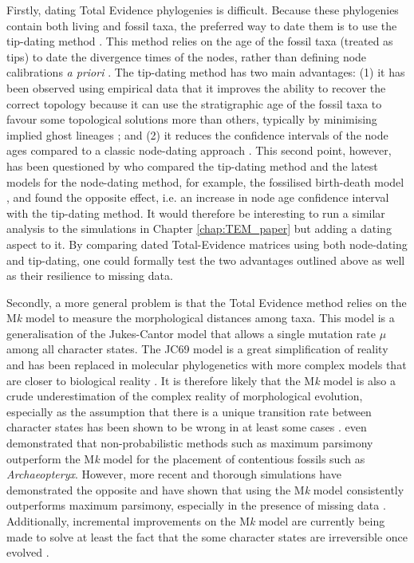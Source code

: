 Firstly, dating Total Evidence phylogenies is difficult. 
Because these phylogenies contain both living and fossil taxa, the preferred way to date them is to use the tip-dating method \citep[e.g.][]{ronquista2012,Wood01032013,Dembo2015}.
This method relies on the age of the fossil taxa (treated as tips) to date the divergence times of the nodes, rather than defining node calibrations \textit{a priori} \citep[cf. node-dating;][]{ronquista2012}.
The tip-dating method has two main advantages: (1) it has been observed using empirical data that it improves the ability to recover the correct topology because it can use the stratigraphic age of the fossil taxa to favour some topological solutions more than others, typically by minimising implied ghost lineages \citep[][and personal communications]{BEASTmaster}; and (2) it reduces the confidence intervals of the node ages compared to a classic node-dating approach \citep{ronquista2012}.
This second point, however, has been questioned by \cite{Arcila2015131} who compared the tip-dating method and the latest models for the node-dating method, for example, the fossilised birth-death model \citep{heaththe2013}, and found the opposite effect, i.e. an increase in node age confidence interval with the tip-dating method.
It would therefore be interesting to run a similar analysis to the simulations in Chapter \ref{chap:TEM_paper} but adding a dating aspect to it.
By comparing dated Total-Evidence matrices using both node-dating and tip-dating, one could formally test the two advantages outlined above as well as their resilience to missing data.

Secondly, a more general problem is that the Total Evidence method relies on the M\textit{k} model \citep{lewisa2001} to measure the morphological distances among taxa.
This model is a generalisation of the Jukes-Cantor model \citep[JC69;][]{jukes1969evolution} that allows a single mutation rate $\mu$ among all character states.
The JC69 model is a great simplification of reality and has been replaced in molecular phylogenetics with more complex models that are closer to biological reality \citep[e.g. the GTR model that allows a different rate for each different type of nucleotide change;][]{tavare1986}.
It is therefore likely that the M\textit{k} model is also a crude underestimation of the complex reality of morphological evolution, especially as the assumption that there is a unique transition rate between character states has been shown to be wrong in at least some cases \citep[e.g. for Dollo traits that are irreversible;][]{WrightDollo}.
\cite{spencerefficacy2013} even demonstrated that non-probabilistic methods such as maximum parsimony outperform the M\textit{k} model for the placement of contentious fossils such as \textit{Archaeopteryx}.
However, more recent and thorough simulations have demonstrated the opposite and have shown that using the M\textit{k} model consistently outperforms maximum parsimony, especially in the presence of missing data \citep{wrightbayesian2014}.
Additionally, incremental improvements on the M\textit{k} model are currently being made to solve at least the fact that the some character states are irreversible once evolved \citep[][and personal communications]{Klopfstein12082015}.

